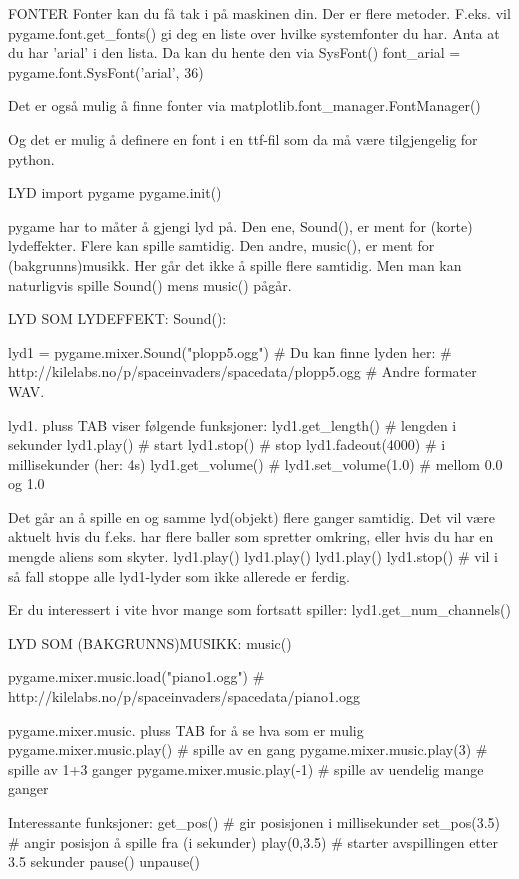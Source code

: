 \documentclass[a4paper,11pt,utf8]{book}
\begin{document}
FONTER
Fonter kan du få tak i på maskinen din.
Der er flere metoder.
F.eks. vil pygame.font.get_fonts()
gi deg en liste over hvilke systemfonter du har.
Anta at du har 'arial' i den lista.
Da kan du hente den via SysFont()
font_arial = pygame.font.SysFont('arial', 36)

Det er også mulig å finne fonter via 
matplotlib.font_manager.FontManager()

Og det er mulig å definere en font i en ttf-fil
som da må være tilgjengelig for python. 



LYD
import pygame
pygame.init()

pygame har to måter å gjengi lyd på.
Den ene, Sound(), er ment for (korte) lydeffekter.
Flere kan spille samtidig. 
Den andre, music(), er ment for (bakgrunns)musikk.
Her går det ikke å spille flere samtidig.
Men man kan naturligvis spille Sound() mens music() pågår.

LYD SOM LYDEFFEKT: Sound(): 

lyd1 = pygame.mixer.Sound("plopp5.ogg")
# Du kan finne lyden her:
# http://kilelabs.no/p/spaceinvaders/spacedata/plopp5.ogg
# Andre formater WAV. 

lyd1.  pluss TAB viser følgende funksjoner:
lyd1.get_length()     # lengden i sekunder
lyd1.play()           # start
lyd1.stop()           # stop
lyd1.fadeout(4000)    # i millisekunder (her: 4s)
lyd1.get_volume()     #
lyd1.set_volume(1.0)  # mellom 0.0 og 1.0

Det går an å spille en og samme lyd(objekt) flere ganger samtidig.
Det vil være aktuelt hvis du f.eks. har flere baller som spretter omkring,
eller hvis du har en mengde aliens som skyter.
lyd1.play()
lyd1.play()
lyd1.play()
lyd1.stop()   # vil i så fall stoppe alle lyd1-lyder som ikke allerede er ferdig. 

Er du interessert i vite hvor mange som fortsatt spiller: 
lyd1.get_num_channels()



LYD SOM (BAKGRUNNS)MUSIKK: music()

pygame.mixer.music.load("piano1.ogg")
# http://kilelabs.no/p/spaceinvaders/spacedata/piano1.ogg 

pygame.mixer.music.  pluss TAB for å se hva som er mulig 
pygame.mixer.music.play()    # spille av en gang
pygame.mixer.music.play(3)   # spille av 1+3 ganger
pygame.mixer.music.play(-1)  # spille av uendelig mange ganger

Interessante funksjoner:
get_pos()     # gir posisjonen i millisekunder
set_pos(3.5)  # angir posisjon å spille fra (i sekunder)
play(0,3.5)   # starter avspillingen etter 3.5 sekunder 
pause()
unpause()
\end{document}
